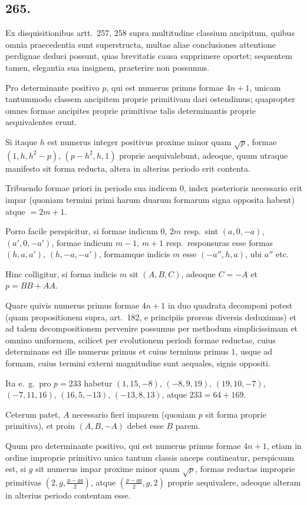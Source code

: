 \documentclass[12pt,a4paper]{article}
\theoremstyle{plain}
\theoremstyle{definition}
\theoremstyle{remark}
\begin{document}
\subsection*{265.}

Ex disquisitionibus artt.\ 257, 258 supra multitudine classium ancipitum, quibus omnia praecedentia sunt superstructa, multae aliae conclusiones attentione perdignae deduci possunt, quas brevitatis causa supprimere oportet; sequentem tamen, elegantia sua insignem, praeterire non possumus.

Pro determinante positivo $p$, qui est numerus primus formae $4n+1$, unicam tantummodo classem ancipitem proprie primitivam dari ostendimus; quapropter omnes formae ancipites proprie primitivae talis determinantis proprie aequivalentes erunt.

Si itaque $h$ est numerus integer positivus proxime minor quam $\sqrt{p}$, formae $(1,h,h^2-p)$, $(p-h^2,h,1)$ proprie aequivalebunt, adeoque, quum utraque manifesto sit forma reducta, altera in alterius periodo erit contenta.

Tribuendo formae priori in periodo sua indicem $0$, index posterioris necessario erit impar (quoniam termini primi harum duarum formarum signa opposita habent) atque $= 2m+1$.

Porro facile perspicitur, si formae indicum $0$, $2m$ resp.\ sint $(a,0,-a)$, $(a',0,-a')$, formae indicum $m-1$, $m+1$ resp.\ responsuras esse formas $(h,a,a')$, $(h,-a,-a')$, formamque indicis $m$ esse $(-a'',h,a)$, ubi $a''$ etc.

Hinc colligitur, si forma indicis $m$ sit $(A,B,C)$, adeoque $C = -A$ et $p = BB+AA$.

Quare quivis numerus primus formae $4n+1$ in duo quadrata decomponi potest (quam propositionem supra, art.\ 182, e principiis prorsus diversis deduximus) et ad talem decompositionem pervenire possumus per methodum simplicissimam et omnino uniformem, scilicet per evolutionem periodi formae reductae, cuius determinans est ille numerus primus et cuius terminus primus $1$, usque ad formam, cuius termini externi magnitudine sunt aequales, signis oppositi.

Ita e.\ g.\ pro $p = 233$ habetur $(1,15,-8)$, $(-8,9,19)$, $(19,10,-7)$, $(-7,11,16)$, $(16,5,-13)$, $(-13,8,13)$, atque $233 = 64+169$.

Ceterum patet, $A$ necessario fieri imparem (quoniam $p$ sit forma proprie primitiva), et proin $(A,B,-A)$ debet esse $B$ parem.

Quum pro determinante positivo, qui est numerus primus formae $4n+1$, etiam in ordine improprie primitivo unica tantum classis anceps contineatur, perspicuum est, si $g$ sit numerus impar proxime minor quam $\sqrt{p}$, formas reductas improprie primitivas $(2,g,\frac{p-gg}{2})$, atque $(\frac{p-gg}{2},g,2)$ proprie aequivalere, adeoque alteram in alterius periodo contentam esse.
\end{document}
